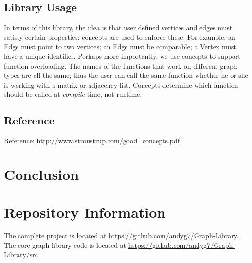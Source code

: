 \documentclass{article}
\begin{document}
\subsection{Library Usage}
In terms of this library, the idea is that user defined vertices and edges must satisfy certain properties; concepts are used to enforce these. For example, an Edge must point to two vertices; an Edge must be comparable; a Vertex must have a unique identifier. Perhaps more importantly, we use concepts to support function overloading. The names of the functions that work on different graph types are all the same; thus the user can call the same function whether he or she is working with a matrix or adjacency list. Concepts determine which function should be called at \emph{compile} time, not runtime. 

\subsection{Reference}
Reference: \url{http://www.stroustrup.com/good_concepts.pdf}
\section{Conclusion}

\section{Repository Information}
The complete project is located at \url{https://github.com/andyg7/Graph-Library}.
The core graph library code is located at \url{https://github.com/andyg7/Graph-Library/src}
\end{document}

